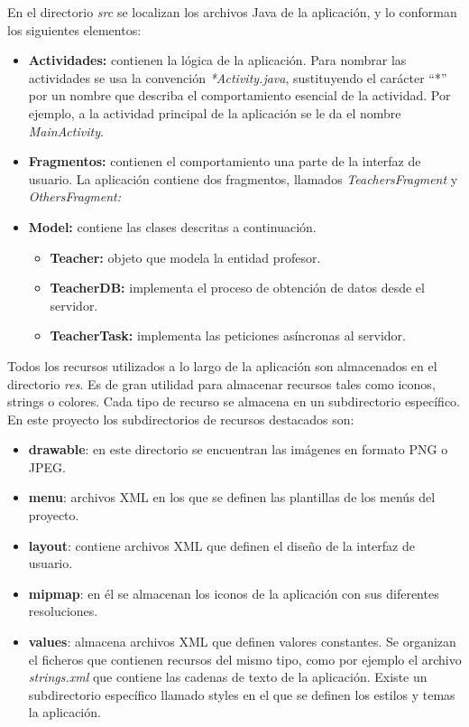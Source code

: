 \documentclass[12pt, a4paper, titlepage]{article}
\begin{document}
	En el directorio \textit{src} se localizan los archivos Java de la aplicación, y lo conforman los siguientes elementos:
	\begin{itemize}
		\item \textbf{Actividades:} contienen la lógica de la aplicación. Para nombrar las actividades se usa la convención \textit{*Activity.java}, sustituyendo el carácter “*” por un nombre que describa el comportamiento esencial de la actividad. Por ejemplo, a la actividad principal de la aplicación se le da el nombre \textit{MainActivity}.
		\item \textbf{Fragmentos:} contienen el comportamiento una parte de la interfaz de usuario. La aplicación contiene dos fragmentos, llamados \textit{TeachersFragment} y \textit{OthersFragment:}
		\item \textbf{Model:} contiene las clases descritas a continuación.
		\begin{itemize}
			\item \textbf{Teacher:} objeto que modela la entidad profesor.
			\item \textbf{TeacherDB:} implementa el proceso de obtención de datos desde el servidor.
			\item \textbf{TeacherTask:} implementa las peticiones asíncronas al servidor.
		\end{itemize}
	\end{itemize}
	
	Todos los recursos utilizados a lo largo de la aplicación son almacenados en el directorio \textit{res}. Es de gran utilidad para almacenar recursos tales como iconos, strings o colores. Cada tipo de recurso se almacena en un subdirectorio específico. En este proyecto los subdirectorios de recursos destacados son:
	\begin{itemize}
		\item \textbf{drawable}: en este directorio se encuentran las imágenes en formato PNG o JPEG.
		\item \textbf{menu}: archivos XML en los que se definen las plantillas de los menús del proyecto.
		\item \textbf{layout}: contiene archivos XML que definen el diseño de la interfaz de usuario.
		\item \textbf{mipmap}: en él se almacenan los iconos de la aplicación con sus diferentes resoluciones.
		\item \textbf{values}: almacena archivos XML que definen valores constantes. Se organizan el ficheros que contienen recursos del mismo tipo, como por ejemplo el archivo \textit{strings.xml} que contiene las cadenas de texto de la aplicación. Existe un subdirectorio específico llamado styles en el que se definen los estilos y temas la aplicación.
	\end{itemize}
	
\end{document}

